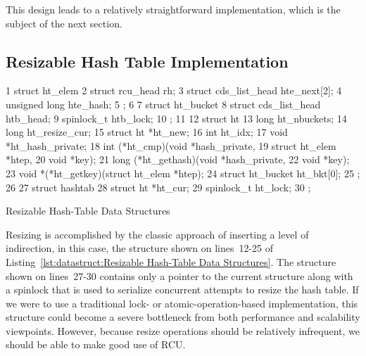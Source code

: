 This design leads to a relatively straightforward implementation,
which is the subject of the next section.

\subsection{Resizable Hash Table Implementation}
\label{sec:datastruct:Resizable Hash Table Implementation}

\begin{listing}[tb]
{ \scriptsize
\begin{verbbox}
 1 struct ht_elem {
 2   struct rcu_head rh;
 3   struct cds_list_head hte_next[2];
 4   unsigned long hte_hash;
 5 };
 6 
 7 struct ht_bucket {
 8   struct cds_list_head htb_head;
 9   spinlock_t htb_lock;
10 };
11 
12 struct ht {
13   long ht_nbuckets;
14   long ht_resize_cur;
15   struct ht *ht_new;
16   int ht_idx;
17   void *ht_hash_private;
18   int (*ht_cmp)(void *hash_private,
19                 struct ht_elem *htep,
20                 void *key);
21   long (*ht_gethash)(void *hash_private,
22                      void *key);
23   void *(*ht_getkey)(struct ht_elem *htep);
24   struct ht_bucket ht_bkt[0];
25 };
26 
27 struct hashtab {
28   struct ht *ht_cur;
29   spinlock_t ht_lock;
30 };
\end{verbbox}
}
\centering
\theverbbox
\caption{Resizable Hash-Table Data Structures}
\label{lst:datastruct:Resizable Hash-Table Data Structures}
\end{listing}

Resizing is accomplished by the classic approach of inserting a level
of indirection, in this case, the  structure shown on
lines~12-25 of
Listing~\ref{lst:datastruct:Resizable Hash-Table Data Structures}.
The  structure shown on lines~27-30 contains only a
pointer to the current  structure along with a spinlock that
is used to serialize concurrent attempts to resize the hash table.
If we were to use a traditional lock- or atomic-operation-based
implementation, this  structure could become a severe bottleneck
from both performance and scalability viewpoints.
However, because resize operations should be relatively infrequent,
we should be able to make good use of RCU.

